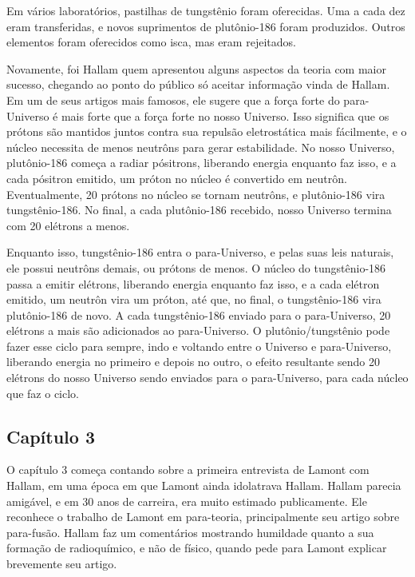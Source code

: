 \documentclass[14pt,portuguese]{extreport}
\begin{document}
    	  Em vários laboratórios, pastilhas de tungstênio foram oferecidas. Uma a cada dez eram transferidas, e novos suprimentos de plutônio-186 foram produzidos. Outros elementos foram oferecidos como isca, mas eram rejeitados.
    	  
    	  Novamente, foi Hallam quem apresentou alguns aspectos da teoria com maior sucesso, chegando ao ponto do público só aceitar informação vinda de Hallam. Em um de seus artigos mais famosos, ele sugere que a força forte do para-Universo é mais forte que a força forte no nosso Universo. Isso significa que os prótons são mantidos juntos contra sua repulsão eletrostática mais fácilmente, e o núcleo necessita de menos neutrôns para gerar estabilidade. No nosso Universo, plutônio-186 começa a radiar pósitrons, liberando energia enquanto faz isso, e a cada pósitron emitido, um próton no núcleo é convertido em neutrôn. Eventualmente, 20 prótons no núcleo se tornam neutrôns, e plutônio-186 vira tungstênio-186. No final, a cada plutônio-186 recebido, nosso Universo termina com 20 elétrons a menos.
    	  
    	  Enquanto isso, tungstênio-186 entra o para-Universo, e pelas suas leis naturais, ele possui neutrôns demais, ou prótons de menos. O núcleo do tungstênio-186 passa a emitir elétrons, liberando energia enquanto faz isso, e a cada elétron emitido, um neutrôn vira um próton, até que, no final, o tungstênio-186 vira plutônio-186 de novo. A cada tungstênio-186 enviado para o para-Universo, 20 elétrons a mais são adicionados ao para-Universo. O plutônio/tungstênio pode fazer esse ciclo para sempre, indo e voltando entre o Universo e para-Universo, liberando energia no primeiro e depois no outro, o efeito resultante sendo 20 elétrons do nosso Universo sendo enviados para o para-Universo, para cada núcleo que faz o ciclo. 
    
      \subsection{Capítulo 3}
	  
    	  O capítulo 3 começa contando sobre a primeira entrevista de Lamont com Hallam, 
    	  em uma época em que Lamont ainda idolatrava Hallam. Hallam parecia amigável, 
    	  e em 30 anos de carreira, era muito estimado publicamente. Ele reconhece o trabalho 
    	  de Lamont em para-teoria, principalmente seu artigo sobre para-fusão. Hallam faz um 
    	  comentários mostrando humildade quanto a sua formação de radioquímico, e não de físico, 
    	  quando pede para Lamont explicar brevemente seu artigo. 
\end{document}
